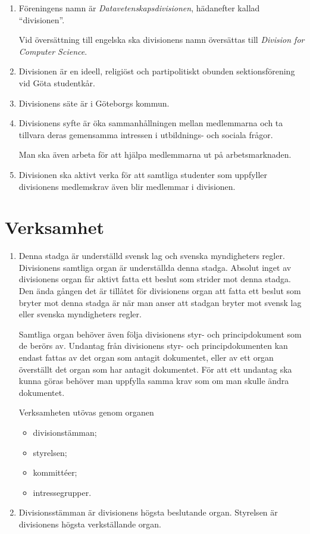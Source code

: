 \documentclass{dvd}
\begin{document}
	\begin{enumerate}[label=\arabic* §, ref=\arabic*]

		\item Föreningens namn är \emph{Datavetenskapsdivisionen}, hädanefter kallad ``divisionen''.

		Vid översättning till engelska ska divisionens namn översättas till \emph{Division for Computer Science}.

		\item Divisionen är en ideell, religiöst och partipolitiskt obunden sektionsförening vid Göta studentkår.

		\item Divisionens säte är i Göteborgs kommun.

		\item Divisionens syfte är öka sammanhållningen mellan medlemmarna och ta tillvara deras gemensamma intressen i utbildnings- och sociala frågor.

		Man ska även arbeta för att hjälpa medlemmarna ut på arbetsmarknaden.

		\item Divisionen ska aktivt verka för att samtliga studenter som uppfyller divisionens medlemskrav även blir medlemmar i divisionen.
	\end{enumerate}

	\section{Verksamhet}

	\begin{enumerate}[label=\arabic* §, ref=\arabic*]
		\item Denna stadga är underställd svensk lag och svenska myndigheters regler.
		Divisionens samtliga organ är underställda denna stadga.
		Absolut inget av divisionens organ får aktivt fatta ett beslut som strider mot denna stadga.
		Den ända gången det är tillåtet för divisionens organ att fatta ett beslut som bryter mot denna stadga är när man anser att stadgan bryter mot svensk lag eller svenska myndigheters regler.

		Samtliga organ behöver även följa divisionens styr- och principdokument som de berörs av.
		Undantag från divisionens styr- och principdokumenten kan endast fattas av det organ som antagit dokumentet, eller av ett organ överställt det organ som har antagit dokumentet.
		För att ett undantag ska kunna göras behöver man uppfylla samma krav som om man skulle ändra dokumentet.


		Verksamheten utövas genom organen

		\begin{itemize}
			\item divisionstämman;
			\item styrelsen;
			\item kommittéer;
			\item intressegrupper.
		\end{itemize}

		\item Divisionsstämman är divisionens högsta beslutande organ.
		Styrelsen är divisionens högsta verkställande organ.
	\end{enumerate}
\end{document}
